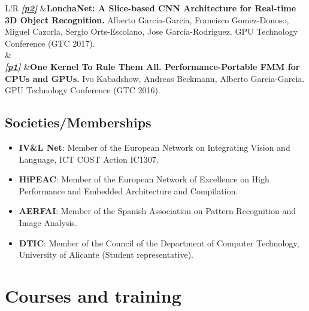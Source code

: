 \documentclass[8pt]{article}
\newcommand\VRule{\color{lightgray}\vrule width 0.5pt}
\begin{document}
\begin{tabular}{L!{\VRule}R}
	\textit{\textbf{\href{http://www.gputechconf.com/resources/poster-gallery/2017/deep-learning-artificial-intelligence}{[p2]}}} &\textbf{LonchaNet: A Slice-based CNN Architecture for Real-time 3D Object Recognition.} Alberto Garcia-Garcia, Francisco Gomez-Donoso, Miguel Cazorla, Sergio Orts-Escolano, Jose Garcia-Rodriguez. GPU Technology Conference (GTC 2017).\\
	& \\
	\textit{\href{http://www.gputechconf.com/resources/poster-gallery/2016/algorithms}{\textbf{[p1]}}} &\textbf{One Kernel To Rule Them All. Performance-Portable FMM for CPUs and GPUs.} Ivo Kabadshow, Andreas Beckmann, Alberto Garcia-Garcia. GPU Technology Conference (GTC 2016).\\
\end{tabular}

\subsection*{Societies/Memberships}

\begin{itemize}
	\item \textbf{IV\&L Net}: Member of the European Network on Integrating Vision and Language, ICT COST Action IC1307.
	\item \textbf{HiPEAC}: Member of the European Network of Excellence on High Performance and Embedded Architecture and Compilation.
	\item \textbf{AERFAI}: Member of the Spanish Association on Pattern Recognition and Image Analysis.
	\item \textbf{DTIC}: Member of the Council of the Department of Computer Technology, University of Alicante (Student representative).
\end{itemize}


\section*{Courses and training}
\end{document}
